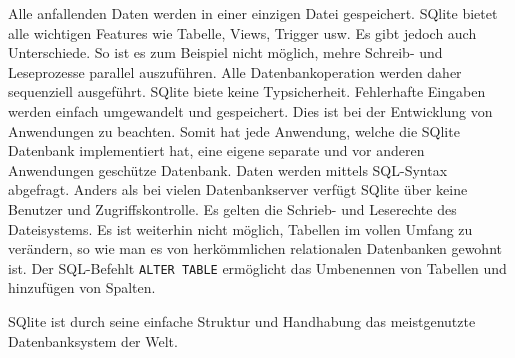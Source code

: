 Alle anfallenden Daten werden in einer einzigen Datei gespeichert. SQlite bietet alle wichtigen Features wie Tabelle, Views, Trigger usw. Es gibt jedoch auch Unterschiede. So ist es zum Beispiel nicht möglich, mehre Schreib- und Leseprozesse parallel auszuführen. Alle Datenbankoperation werden daher sequenziell ausgeführt. SQlite biete keine Typsicherheit. Fehlerhafte Eingaben werden einfach umgewandelt und gespeichert. Dies ist bei der Entwicklung von Anwendungen zu beachten. Somit hat jede Anwendung, welche die SQlite Datenbank implementiert hat, eine eigene separate und vor anderen Anwendungen geschütze Datenbank. Daten werden mittels SQL-Syntax abgefragt. Anders als bei vielen Datenbankserver verfügt SQlite über keine Benutzer und Zugriffskontrolle. Es gelten die Schrieb- und Leserechte des Dateisystems. Es ist weiterhin nicht möglich, Tabellen im vollen Umfang zu verändern, so wie man es von herkömmlichen relationalen Datenbanken gewohnt ist. Der SQL-Befehlt \verb+ALTER TABLE+ ermöglicht das Umbenennen von Tabellen und hinzufügen von Spalten.

SQlite ist durch seine einfache Struktur und Handhabung das meistgenutzte Datenbanksystem der Welt.